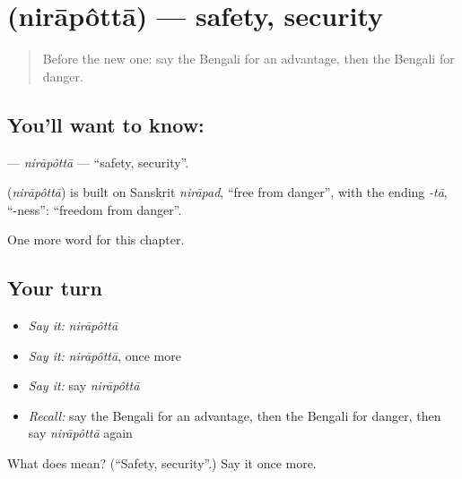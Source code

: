 \section[\texorpdfstring{\bn{নিরাপত্তা} (nirāpôttā)}{নিরাপত্তা (nirāpôttā)}]{ (nirāpôttā) — safety, security}

\label{lesson:BN-C254-nirapotta}



\begin{quote}
Before the new one: say the Bengali for an advantage, then the Bengali for danger.
\end{quote}

\subsection*{You'll want to know: }
\textbf{} — \emph{nirāpôttā} — \textquotedblleft{}safety, security\textquotedblright{}.

\begin{cousinweb}
\textbf{} (\emph{nirāpôttā}) is built on Sanskrit \emph{nirāpad}, \textquotedblleft{}free from danger\textquotedblright{}, with the ending \emph{-tā}, \textquotedblleft{}-ness\textquotedblright{}: \textquotedblleft{}freedom from danger\textquotedblright{}.
\end{cousinweb}

\begin{grammarlens}[title={What you've built}]
One more word for this chapter.
\end{grammarlens}

\subsection*{Your turn}
\begin{itemize}
\raggedright
  \item \emph{Say it:} \emph{nirāpôttā}
  \item \emph{Say it:} \emph{nirāpôttā}, once more
  \item \emph{Say it:} say \emph{nirāpôttā}
  \item \emph{Recall:} say the Bengali for an advantage, then the Bengali for danger, then say \emph{nirāpôttā} again
\end{itemize}

\begin{tcolorbox}[breakable,colback=teal!4,colframe=teal!35!black,title={Before you move on}]
What does  mean? (\textquotedblleft{}Safety, security\textquotedblright{}.) Say it once more.
\end{tcolorbox}
